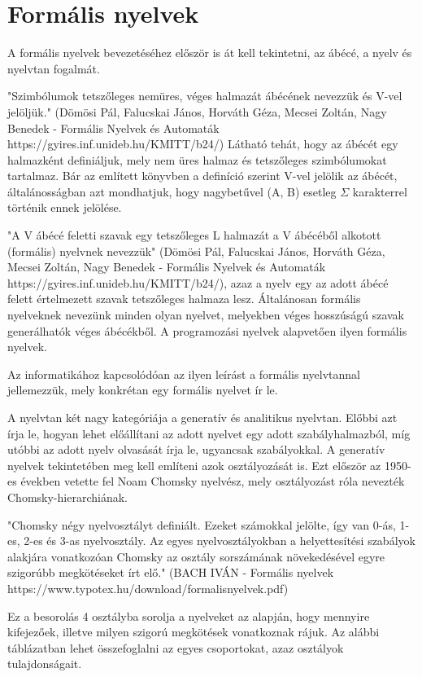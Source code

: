 
\section{Formális nyelvek}

A formális nyelvek bevezetéséhez először is át kell tekintetni, az ábécé, a nyelv és nyelvtan fogalmát.

"Szimbólumok tetszőleges nemüres, véges halmazát ábécének nevezzük és V-vel jelöljük." (Dömösi Pál, Falucskai János, Horváth Géza, Mecsei Zoltán, Nagy Benedek - Formális Nyelvek és Automaták https://gyires.inf.unideb.hu/KMITT/b24/) Látható tehát, hogy az ábécét egy halmazként definiáljuk, mely nem üres halmaz és tetszőleges szimbólumokat tartalmaz. Bár az említett könyvben a definíció szerint V-vel jelölik az ábécét, általánosságban azt mondhatjuk, hogy nagybetűvel (A, B) esetleg $\Sigma$ karakterrel történik ennek jelölése.

"A V ábécé feletti szavak egy tetszőleges L halmazát a V ábécéből alkotott (formális) nyelvnek nevezzük" (Dömösi Pál, Falucskai János, Horváth Géza, Mecsei Zoltán, Nagy Benedek - Formális Nyelvek és Automaták https://gyires.inf.unideb.hu/KMITT/b24/), azaz a nyelv egy az adott ábécé felett értelmezett szavak tetszőleges halmaza lesz. Általánosan formális nyelveknek nevezünk minden olyan nyelvet, melyekben véges hosszúságú szavak generálhatók véges ábécékből. A programozási nyelvek alapvetően ilyen formális nyelvek.

Az informatikához kapcsolódóan az ilyen leírást a formális nyelvtannal jellemezzük, mely konkrétan egy formális nyelvet ír le.

A nyelvtan két nagy kategóriája a generatív és analitikus nyelvtan. Előbbi azt írja le, hogyan lehet előállítani az adott nyelvet egy adott szabályhalmazból, míg utóbbi az adott nyelv olvasását írja le, ugyancsak szabályokkal.
A generatív nyelvek tekintetében meg kell említeni azok osztályozását is. Ezt először az 1950-es években vetette fel Noam Chomsky nyelvész, mely osztályozást róla nevezték Chomsky-hierarchiának.

"Chomsky négy nyelvosztályt definiált. Ezeket számokkal jelölte, így van 0-ás, 1-es, 2-es és 3-as nyelvosztály. Az egyes nyelvosztályokban a helyettesítési szabályok alakjára vonatkozóan Chomsky az osztály sorszámának növekedésével egyre szigorúbb megkötéseket írt elő." (BACH IVÁN - Formális nyelvek https://www.typotex.hu/download/formalisnyelvek.pdf)

 Ez a besorolás 4 osztályba sorolja a nyelveket az alapján, hogy mennyire kifejezőek, illetve milyen szigorú megkötések vonatkoznak rájuk. Az alábbi táblázatban lehet összefoglalni az egyes csoportokat, azaz osztályok tulajdonságait.
 
